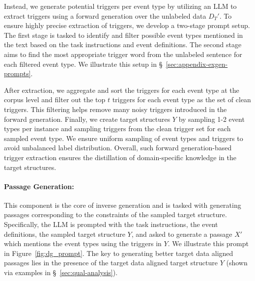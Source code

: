 Instead, we generate potential triggers per event type by utilizing an LLM to extract triggers using a forward generation over the unlabeled data $D_T'$.
To ensure highly precise extraction of triggers, we develop a two-stage prompt setup.
The first stage is tasked to identify and filter possible event types mentioned in the text based on the task instructions and event definitions.
The second stage aims to find the most appropriate trigger word from the unlabeled sentence for each filtered event type.
We illustrate this setup in \S~\ref{sec:appendix-exgen-prompts}.

After extraction, we aggregate and sort the triggers for each event type at the corpus level and filter out the top $t$ triggers for each event type as the set of clean triggers.
This filtering helps remove many noisy triggers introduced in the forward generation.
Finally, we create target structures $Y$ by sampling 1-2 event types per instance and sampling triggers from the clean trigger set for each sampled event type.
We ensure uniform sampling of event types and triggers to avoid unbalanced label distribution.
Overall, such forward generation-based trigger extraction ensures the distillation of domain-specific knowledge in the target structures.

\paragraph{Passage Generation:}
This component is the core of inverse generation and is tasked with generating passages corresponding to the constraints of the sampled target structure.
Specifically, the LLM is prompted with the task instructions, the event definitions, the sampled target structure $Y$, and asked to generate a passage $X'$ which mentions the event types using the triggers in $Y$.
We illustrate this prompt in Figure~\ref{fig:dg_prompt}.
The key to generating better target data aligned passages lies in the presence of the target data aligned target structure $Y$ (shown via examples in \S~\ref{sec:qual-analysis}).


